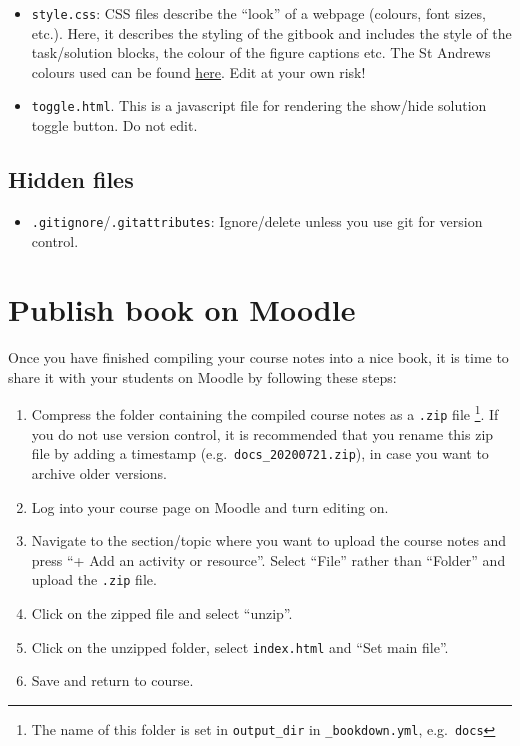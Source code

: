 \documentclass[
  oneside]{krantz}
\providecommand{\tightlist}{%
  \setlength{\itemsep}{0pt}\setlength{\parskip}{0pt}}
\theoremstyle{definition}
\theoremstyle{definition}
\theoremstyle{definition}
\theoremstyle{remark}
\begin{document}
\begin{itemize}
\item
  \texttt{style.css}: CSS files describe the ``look'' of a webpage (colours, font sizes, etc.). Here, it describes the styling of the gitbook and includes the style of the task/solution blocks, the colour of the figure captions etc. The St Andrews colours used can be found \href{https://www.st-andrews.ac.uk/brand/design-guidelines/colours/}{here}. Edit at your own risk!
\item
  \texttt{toggle.html}. This is a javascript file for rendering the show/hide solution toggle button. Do not edit.
\end{itemize}

\hypertarget{hidden-files}{%
\subsection*{Hidden files}\label{hidden-files}}


\begin{itemize}
\tightlist
\item
  \texttt{.gitignore}/\texttt{.gitattributes}: Ignore/delete unless you use git for version control.
\end{itemize}

\hypertarget{publish-book-on-moodle}{%
\section{Publish book on Moodle}\label{publish-book-on-moodle}}

Once you have finished compiling your course notes into a nice book, it is time to share it with your students on Moodle by following these steps:

\begin{enumerate}
\def\labelenumi{\arabic{enumi}.}
\item
  Compress the folder containing the compiled course notes as a \texttt{.zip} file
  \footnote{The name of this folder is set in \texttt{output\_dir} in \texttt{\_bookdown.yml}, e.g.~\texttt{docs}}.
  If you do not use version control, it is recommended that you rename this zip file by adding a timestamp (e.g.~\texttt{docs\_20200721.zip}), in case you want to archive older versions.
\item
  Log into your course page on Moodle and turn editing on.
\item
  Navigate to the section/topic where you want to upload the course notes and press ``+ Add an activity or resource''.
  Select ``File'' rather than ``Folder'' and upload the \texttt{.zip} file.
\item
  Click on the zipped file and select ``unzip''.
\item
  Click on the unzipped folder, select \texttt{index.html} and ``Set main file''.
\item
  Save and return to course.
\end{enumerate}
\end{document}
